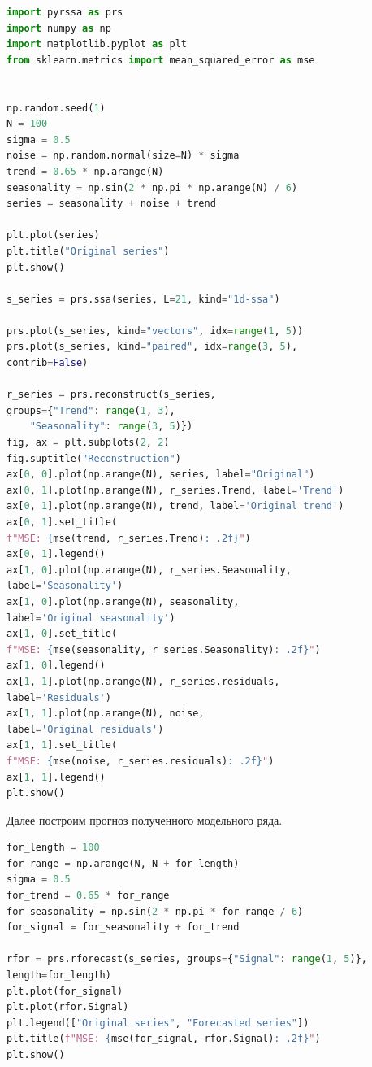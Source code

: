 \documentclass[specialist,
			   substylefile = spbu_report.rtx,
			   subf,href,colorlinks=true, 12pt]{disser}
\begin{document}
\begin{lstlisting}[language=Python, caption=Программный код для разложения и восстановления модельного ряда на Python.]
import pyrssa as prs
import numpy as np
import matplotlib.pyplot as plt
from sklearn.metrics import mean_squared_error as mse


np.random.seed(1)
N = 100
sigma = 0.5
noise = np.random.normal(size=N) * sigma
trend = 0.65 * np.arange(N)
seasonality = np.sin(2 * np.pi * np.arange(N) / 6)
series = seasonality + noise + trend

plt.plot(series)
plt.title("Original series")
plt.show()

s_series = prs.ssa(series, L=21, kind="1d-ssa")

prs.plot(s_series, kind="vectors", idx=range(1, 5))
prs.plot(s_series, kind="paired", idx=range(3, 5),
contrib=False)

r_series = prs.reconstruct(s_series,
groups={"Trend": range(1, 3),
	"Seasonality": range(3, 5)})
fig, ax = plt.subplots(2, 2)
fig.suptitle("Reconstruction")
ax[0, 0].plot(np.arange(N), series, label="Original")
ax[0, 1].plot(np.arange(N), r_series.Trend, label='Trend')
ax[0, 1].plot(np.arange(N), trend, label='Original trend')
ax[0, 1].set_title(
f"MSE: {mse(trend, r_series.Trend): .2f}")
ax[0, 1].legend()
ax[1, 0].plot(np.arange(N), r_series.Seasonality,
label='Seasonality')
ax[1, 0].plot(np.arange(N), seasonality,
label='Original seasonality')
ax[1, 0].set_title(
f"MSE: {mse(seasonality, r_series.Seasonality): .2f}")
ax[1, 0].legend()
ax[1, 1].plot(np.arange(N), r_series.residuals,
label='Residuals')
ax[1, 1].plot(np.arange(N), noise,
label='Original residuals')
ax[1, 1].set_title(
f"MSE: {mse(noise, r_series.residuals): .2f}")
ax[1, 1].legend()
plt.show()
\end{lstlisting}

Далее построим прогноз полученного модельного ряда.

\begin{lstlisting}[language=Python, caption=Программный код для прогноза модельного ряда на Python.]
for_length = 100
for_range = np.arange(N, N + for_length)
sigma = 0.5
for_trend = 0.65 * for_range
for_seasonality = np.sin(2 * np.pi * for_range / 6)
for_signal = for_seasonality + for_trend

rfor = prs.rforecast(s_series, groups={"Signal": range(1, 5)},
length=for_length)
plt.plot(for_signal)
plt.plot(rfor.Signal)
plt.legend(["Original series", "Forecasted series"])
plt.title(f"MSE: {mse(for_signal, rfor.Signal): .2f}")
plt.show()
\end{lstlisting}
\end{document}
